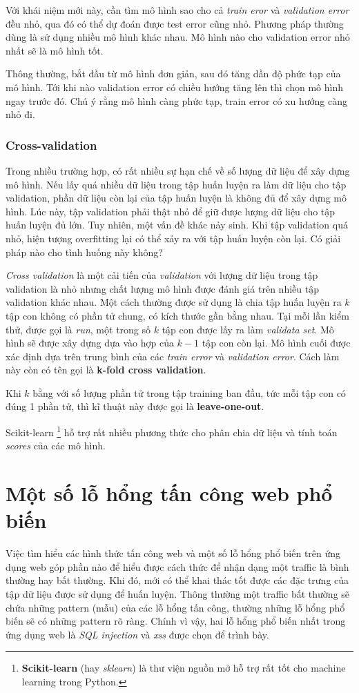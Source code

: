 \documentclass[../main-report.tex]{subfiles}
\begin{document}
Với khái niệm mới này, cần tìm mô hình sao cho cả \emph{train eror} và \emph{validation error} đều nhỏ, qua đó có thể dự đoán được test error cũng nhỏ. Phương pháp thường dùng là sử dụng nhiều mô hình khác nhau. Mô hình nào cho validation error nhỏ nhất sẽ là mô hình tốt.

Thông thường, bắt đầu từ mô hình đơn giản, sau đó tăng dần độ phức tạp của mô hình. Tới khi nào validation error có chiều hướng tăng lên thì chọn mô hình ngay trước đó. Chú ý rằng mô hình càng phức tạp, train error có xu hướng càng nhỏ đi.

\subsubsection*{Cross-validation}
Trong nhiều trường hợp, có rất nhiều sự hạn chế về số lượng dữ liệu để xây dựng mô hình. Nếu lấy quá nhiều dữ liệu trong tập huấn luyện ra làm dữ liệu cho tập validation, phần dữ liệu còn lại của tập huấn luyện là không đủ để xây dựng mô hình. Lúc này, tập validation phải thật nhỏ để giữ được lượng dữ liệu cho tập huấn luyện đủ lớn. Tuy nhiên, một vấn đề khác nảy sinh. Khi tập validation quá nhỏ, hiện tượng overfitting lại có thể xảy ra với tập huấn luyện còn lại. Có giải pháp nào cho tình huống này không?

\emph{Cross validation} là một cải tiến của \emph{validation} với lượng dữ liệu trong tập validation là nhỏ nhưng chất lượng mô hình được đánh giá trên nhiều tập validation khác nhau. Một cách thường được sử dụng là chia tập huấn luyện ra \(k\) tập con không có phần tử chung, có kích thước gần bằng nhau. Tại mỗi lần kiểm thử, được gọi là \emph{run}, một trong số \(k\) tập con được lấy ra làm \emph{validata set}. Mô hình sẽ được xây dựng dựa vào hợp của \(k-1\) tập con còn lại. Mô hình cuối được xác định dựa trên trung bình của các \emph{train error} và \emph{validation error}. Cách làm này còn có tên gọi là \textbf{k-fold cross validation}.

Khi \(k\) bằng với số lượng phần tử trong tập training ban đầu, tức mỗi tập con có đúng 1 phần tử, thì kĩ thuật này được gọi là \textbf{leave-one-out}.

Scikit-learn \footnote{\textbf{Scikit-learn} (hay \emph{sklearn}) là thư viện nguồn mở hỗ trợ rất tốt cho machine learning trong Python.} hỗ trợ rất nhiều phương thức cho phân chia dữ liệu và tính toán \emph{scores} của các mô hình.
\section{Một số lỗ hổng tấn công web phổ biến}
Việc tìm hiểu các hình thức tấn công web và một số lỗ hổng phổ biến trên ứng dụng web góp phần nào để hiểu được cách thức để nhận dạng một traffic là bình thường hay bất thường. Khi đó, mới có thể khai thác tốt được các đặc trưng của tập dữ liệu được sử dụng để huấn luyện. Thông thường một traffic bất thường sẽ chứa những pattern (mẫu) của các lỗ hổng tấn công, thường những lỗ hổng phổ biến sẽ có những pattern rõ ràng. Chính vì vậy, hai lỗ hổng phổ biến nhất trong ứng dụng web là \emph{SQL injection} và \emph{\acrshort{xss}} được chọn để trình bày.
\end{document}
